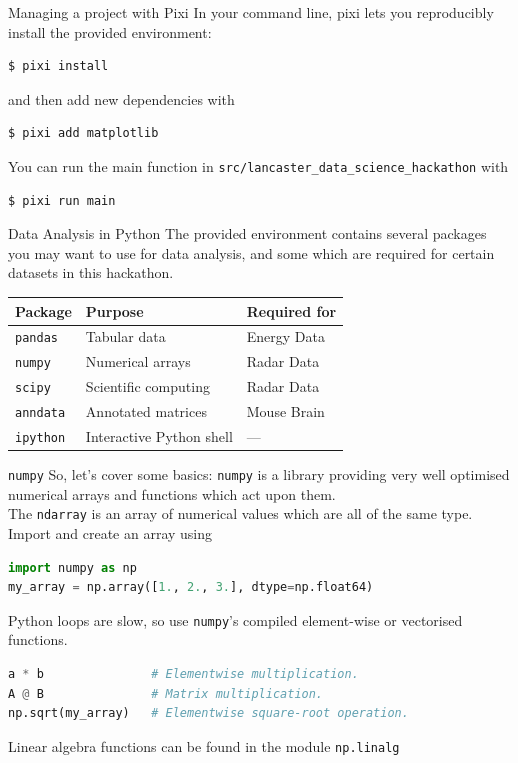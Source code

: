 \begin{frame}[fragile]{Managing a project with Pixi}
  In your command line, pixi lets you reproducibly install the provided environment:
  \begin{lstlisting}[language=Bash]
$ pixi install
  \end{lstlisting}
  and then add new dependencies with
  \begin{lstlisting}[language=Bash]
$ pixi add matplotlib
  \end{lstlisting}
    You can run the main function in \texttt{src{\slash}lancaster\_data\_science\_hackathon} with
  \begin{lstlisting}
$ pixi run main
  \end{lstlisting}
\end{frame}

\begin{frame}{Data Analysis in Python}
  The provided environment contains several packages you may want to use for data analysis, and some which are required for certain datasets in this hackathon.
  \vspace{6pt}
  \begin{center}
    \begin{tabular}{lll}
      \toprule
      Package & Purpose & Required for \\
      \midrule
      \texttt{pandas}  & Tabular data             & Energy Data \\
      \texttt{numpy}   & Numerical arrays         & Radar Data \\
      \texttt{scipy}   & Scientific computing     & Radar Data \\
      \texttt{anndata} & Annotated matrices       & Mouse Brain \\
      \texttt{ipython} & Interactive Python shell & --- \\
      \bottomrule
    \end{tabular}
    \end{center}
  \vspace{6pt}
\end{frame}

\begin{frame}[fragile]{\texttt{numpy}}
  So, let's cover some basics: \texttt{numpy} is a library providing very well optimised numerical arrays and functions which act upon them. \\
  The \texttt{ndarray} is an array of numerical values which are all of the same type. Import and create an array using
  \begin{lstlisting}[language=Python]
import numpy as np
my_array = np.array([1., 2., 3.], dtype=np.float64)
  \end{lstlisting}
  Python loops are slow, so use \texttt{numpy}'s compiled element-wise or vectorised functions.
  \begin{lstlisting}[language=Python]
a * b               # Elementwise multiplication.
A @ B               # Matrix multiplication.
np.sqrt(my_array)   # Elementwise square-root operation.
  \end{lstlisting}
  Linear algebra functions can be found in the module \texttt{np.linalg}
\end{frame}

